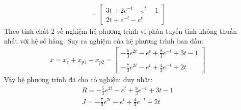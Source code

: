 \begin{align*}
    =\begin{bmatrix}
    3t+2e^{-t}-e^t-1 \\
    2t+e^{-t}-e^t
\end{bmatrix}
\end{align*}
Theo tính chất 2 về nghiệm hệ phương trình vi phân tuyến tính không thuần nhất với hệ số hằng. Suy ra nghiệm của hệ phương trình ban đầu:\\
\begin{align*}
    x=x_c+x_{p1}+x_{p2}
=\begin{bmatrix}
    -\frac{5}{3}e^{2t} -e^t+\frac{8}{3}e^{-t}+3t-1\\\\
     -\frac{7}{3}e^{2t} -e^t+\frac{4}{3}e^{-t}+2t
\end{bmatrix}
\end{align*}
Vậy hệ phương trình đã cho có nghiệm duy nhất:
\begin{align*}
    R= -\frac{5}{3}e^{2t} -e^t+\frac{8}{3}e^{-t}+3t-1\\
    J= -\frac{7}{3}e^{2t} -e^t+\frac{4}{3}e^{-t}+2t
\end{align*}
